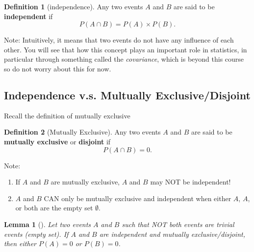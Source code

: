 \documentclass[
]{book}
\newtheorem{lemma}{Lemma}[chapter]
\theoremstyle{definition}
\newtheorem{definition}{Definition}[chapter]
\theoremstyle{definition}
\theoremstyle{definition}
\theoremstyle{definition}
\theoremstyle{remark}
\begin{document}
\begin{definition}[independence]
Any two events \(A\) and \(B\) are said to be \textbf{independent} if
\[
  P(A \cap B) = P(A)\times P(B).
\]
\end{definition}

Note: Intuitively, it means that two events do not have any influence of each other. You will see that how this concept plays an important role in statistics, in particular through something called the \emph{covariance}, which is beyond this course so do not worry about this for now.

\hypertarget{independence-v.s.-multually-exclusivedisjoint}{%
\subsection{Independence v.s. Multually Exclusive/Disjoint}\label{independence-v.s.-multually-exclusivedisjoint}}

Recall the definition of mutually exclusive

\begin{definition}[Mutually Exclusive]
Any two events \(A\) and \(B\) are said to be \textbf{mutually exclusive} or \textbf{disjoint} if
\[
  P(A \cap B) = 0.
\]
\end{definition}

Note:

\begin{enumerate}
\def\labelenumi{\arabic{enumi}.}
\item
  If \(A\) and \(B\) are mutually exclusive, \(A\) and \(B\) may NOT be independent!
\item
  \(A\) and \(B\) CAN only be mutually exclusive and independent when either \(A\), \(A\), or both are the empty set \(\emptyset\).
\end{enumerate}

\begin{lemma}[]
Let two events \(A\) and \(B\) such that NOT both events are trivial events (empty set). If \(A\) and \(B\) are independent and mutually exclusive/disjoint, then either \(P(A) = 0\) or \(P(B) = 0\).
\end{lemma}

  
\end{document}
